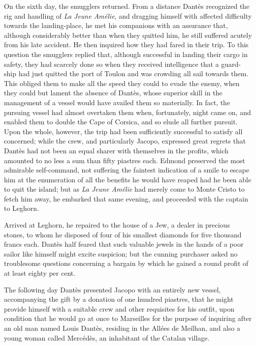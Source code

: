 On the sixth day, the smugglers returned. From a distance Dantès recognized the rig and handling of \textit{La Jeune Amélie}, and dragging himself with affected difficulty towards the landing-place, he met his companions with an assurance that, although considerably better than when they quitted him, he still suffered acutely from his late accident. He then inquired how they had fared in their trip. To this question the smugglers replied that, although successful in landing their cargo in safety, they had scarcely done so when they received intelligence that a guard-ship had just quitted the port of Toulon and was crowding all sail towards them. This obliged them to make all the speed they could to evade the enemy, when they could but lament the absence of Dantès, whose superior skill in the management of a vessel would have availed them so materially. In fact, the pursuing vessel had almost overtaken them when, fortunately, night came on, and enabled them to double the Cape of Corsica, and so elude all further pursuit. Upon the whole, however, the trip had been sufficiently successful to satisfy all concerned; while the crew, and particularly Jacopo, expressed great regrets that Dantès had not been an equal sharer with themselves in the profits, which amounted to no less a sum than fifty piastres each.  Edmond preserved the most admirable self-command, not suffering the faintest indication of a smile to escape him at the enumeration of all the benefits he would have reaped had he been able to quit the island; but as \textit{La Jeune Amélie} had merely come to Monte Cristo to fetch him away, he embarked that same evening, and proceeded with the captain to Leghorn. 

 Arrived at Leghorn, he repaired to the house of a Jew, a dealer in precious stones, to whom he disposed of four of his smallest diamonds for five thousand francs each. Dantès half feared that such valuable jewels in the hands of a poor sailor like himself might excite suspicion; but the cunning purchaser asked no troublesome questions concerning a bargain by which he gained a round profit of at least eighty per cent. 

 The following day Dantès presented Jacopo with an entirely new vessel, accompanying the gift by a donation of one hundred piastres, that he might provide himself with a suitable crew and other requisites for his outfit, upon condition that he would go at once to Marseilles for the purpose of inquiring after an old man named Louis Dantès, residing in the Allées de Meilhan, and also a young woman called Mercédès, an inhabitant of the Catalan village. 


